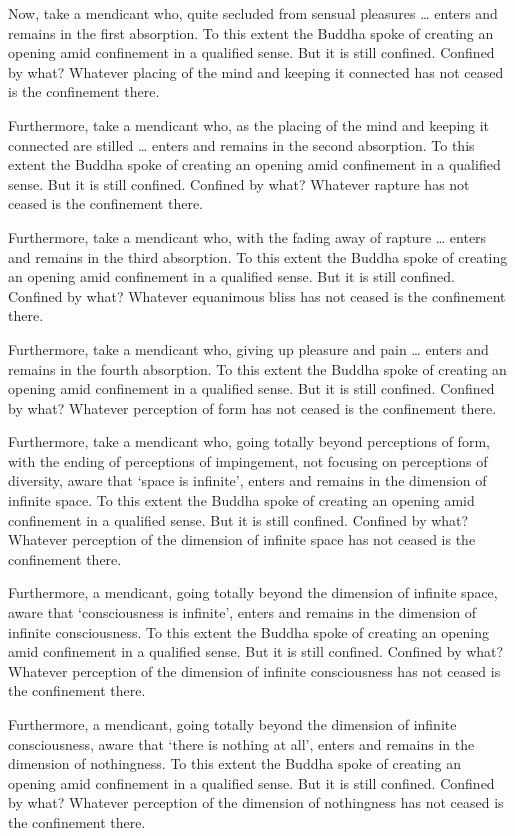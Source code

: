 \documentclass[12pt,openany]{book}%
\begin{document}
Now, take a mendicant who, quite secluded from sensual pleasures … enters and remains in the first absorption. To this extent the Buddha spoke of creating an opening amid confinement in a qualified sense. But it is still confined. Confined by what? Whatever placing of the mind and keeping it connected has not ceased is the confinement there. 

Furthermore, take a mendicant who, as the placing of the mind and keeping it connected are stilled … enters and remains in the second absorption. To this extent the Buddha spoke of creating an opening amid confinement in a qualified sense. But it is still confined. Confined by what? Whatever rapture has not ceased is the confinement there. 

Furthermore, take a mendicant who, with the fading away of rapture … enters and remains in the third absorption. To this extent the Buddha spoke of creating an opening amid confinement in a qualified sense. But it is still confined. Confined by what? Whatever equanimous bliss has not ceased is the confinement there. 

Furthermore, take a mendicant who, giving up pleasure and pain … enters and remains in the fourth absorption. To this extent the Buddha spoke of creating an opening amid confinement in a qualified sense. But it is still confined. Confined by what? Whatever perception of form has not ceased is the confinement there. 

Furthermore, take a mendicant who, going totally beyond perceptions of form, with the ending of perceptions of impingement, not focusing on perceptions of diversity, aware that ‘space is infinite’, enters and remains in the dimension of infinite space. To this extent the Buddha spoke of creating an opening amid confinement in a qualified sense. But it is still confined. Confined by what? Whatever perception of the dimension of infinite space has not ceased is the confinement there. 

Furthermore, a mendicant, going totally beyond the dimension of infinite space, aware that ‘consciousness is infinite’, enters and remains in the dimension of infinite consciousness. To this extent the Buddha spoke of creating an opening amid confinement in a qualified sense. But it is still confined. Confined by what? Whatever perception of the dimension of infinite consciousness has not ceased is the confinement there. 

Furthermore, a mendicant, going totally beyond the dimension of infinite consciousness, aware that ‘there is nothing at all’, enters and remains in the dimension of nothingness. To this extent the Buddha spoke of creating an opening amid confinement in a qualified sense. But it is still confined. Confined by what? Whatever perception of the dimension of nothingness has not ceased is the confinement there. 
\end{document}
